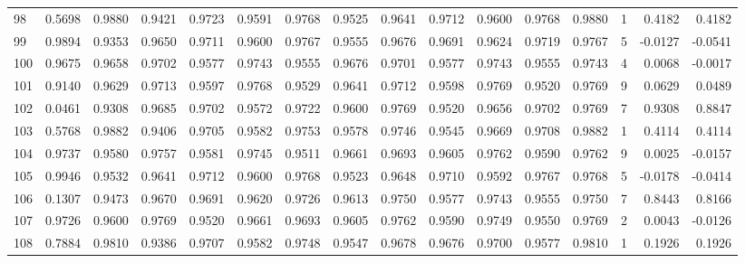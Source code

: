 \begin{tabular}{lrrrrrrrrrrrrrrr}
98  &      0.5698 &  0.9880 &  0.9421 &  0.9723 &  0.9591 &  0.9768 &  0.9525 &  0.9641 &  0.9712 &  0.9600 &   0.9768 &     0.9880 &      1 &                    0.4182 &                     0.4182 \\
99  &      0.9894 &  0.9353 &  0.9650 &  0.9711 &  0.9600 &  0.9767 &  0.9555 &  0.9676 &  0.9691 &  0.9624 &   0.9719 &     0.9767 &      5 &                   -0.0127 &                    -0.0541 \\
100 &      0.9675 &  0.9658 &  0.9702 &  0.9577 &  0.9743 &  0.9555 &  0.9676 &  0.9701 &  0.9577 &  0.9743 &   0.9555 &     0.9743 &      4 &                    0.0068 &                    -0.0017 \\
101 &      0.9140 &  0.9629 &  0.9713 &  0.9597 &  0.9768 &  0.9529 &  0.9641 &  0.9712 &  0.9598 &  0.9769 &   0.9520 &     0.9769 &      9 &                    0.0629 &                     0.0489 \\
102 &      0.0461 &  0.9308 &  0.9685 &  0.9702 &  0.9572 &  0.9722 &  0.9600 &  0.9769 &  0.9520 &  0.9656 &   0.9702 &     0.9769 &      7 &                    0.9308 &                     0.8847 \\
103 &      0.5768 &  0.9882 &  0.9406 &  0.9705 &  0.9582 &  0.9753 &  0.9578 &  0.9746 &  0.9545 &  0.9669 &   0.9708 &     0.9882 &      1 &                    0.4114 &                     0.4114 \\
104 &      0.9737 &  0.9580 &  0.9757 &  0.9581 &  0.9745 &  0.9511 &  0.9661 &  0.9693 &  0.9605 &  0.9762 &   0.9590 &     0.9762 &      9 &                    0.0025 &                    -0.0157 \\
105 &      0.9946 &  0.9532 &  0.9641 &  0.9712 &  0.9600 &  0.9768 &  0.9523 &  0.9648 &  0.9710 &  0.9592 &   0.9767 &     0.9768 &      5 &                   -0.0178 &                    -0.0414 \\
106 &      0.1307 &  0.9473 &  0.9670 &  0.9691 &  0.9620 &  0.9726 &  0.9613 &  0.9750 &  0.9577 &  0.9743 &   0.9555 &     0.9750 &      7 &                    0.8443 &                     0.8166 \\
107 &      0.9726 &  0.9600 &  0.9769 &  0.9520 &  0.9661 &  0.9693 &  0.9605 &  0.9762 &  0.9590 &  0.9749 &   0.9550 &     0.9769 &      2 &                    0.0043 &                    -0.0126 \\
108 &      0.7884 &  0.9810 &  0.9386 &  0.9707 &  0.9582 &  0.9748 &  0.9547 &  0.9678 &  0.9676 &  0.9700 &   0.9577 &     0.9810 &      1 &                    0.1926 &                     0.1926 \\

\end{tabular}
